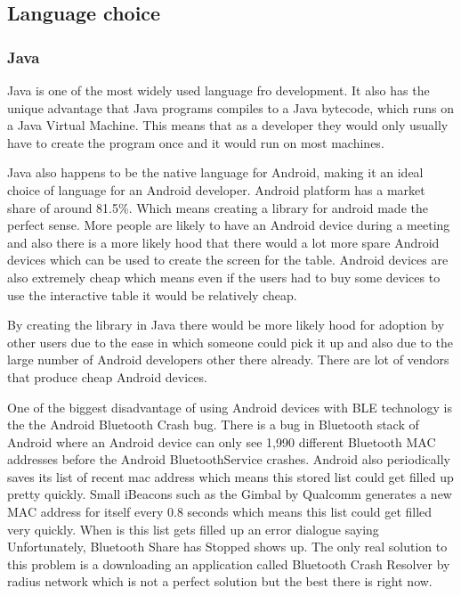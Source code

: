 \subsection{Language choice}


\subsubsection{Java}

Java is one of the most widely used language fro development. It also
has the unique advantage that Java programs compiles to a Java bytecode,
which runs on a Java Virtual Machine. This means that as a developer
they would only usually have to create the program once and it would
run on most machines. 

Java also happens to be the native language for Android, making it
an ideal choice of language for an Android developer. Android platform
has a market share of around 81.5\%\cite{market-share}. Which means
creating a library for android made the perfect sense. More people
are likely to have an Android device during a meeting and also there
is a more likely hood that there would a lot more spare Android devices
which can be used to create the screen for the table. Android devices
are also extremely cheap which means even if the users had to buy
some devices to use the interactive table it would be relatively cheap.

By creating the library in Java there would be more likely hood for
adoption by other users due to the ease in which someone could pick
it up and also due to the large number of Android developers other
there already. There are lot of vendors that produce cheap Android
devices\cite{cheap-android}. 

One of the biggest disadvantage of using Android devices with BLE
technology is the the Android Bluetooth Crash bug\cite{bluetooth-share}.
There is a bug in Bluetooth stack of Android where an Android device
can only see 1,990 different Bluetooth MAC addresses before the Android
BluetoothService crashes. Android also periodically saves its list
of recent mac address which means this stored list could get filled
up pretty quickly. Small iBeacons such as the Gimbal by Qualcomm generates
a new MAC address for itself every 0.8 seconds which means this list
could get filled very quickly. When is this list gets filled up an
error dialogue saying \textquotedbl{}Unfortunately, Bluetooth Share
has Stopped\textquotedbl{} shows up. The only real solution to this
problem is a downloading an application called Bluetooth Crash Resolver by radius
network which is not a perfect solution but the best there is right
now.


